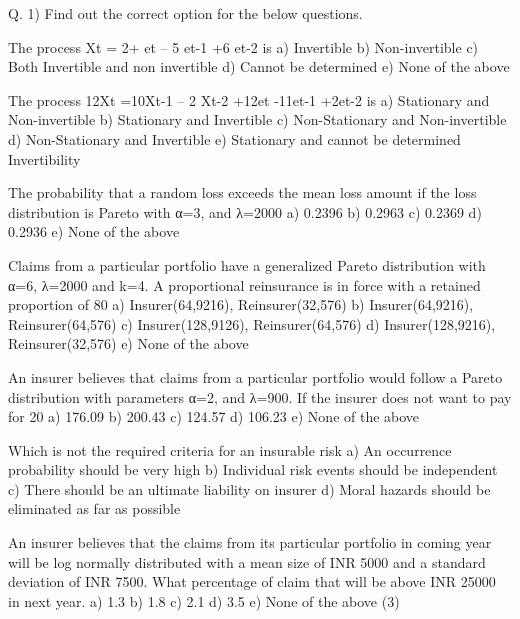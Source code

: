 \documentclass[a4paper,12pt]{article}
\begin{document}
Q. 1) Find out the correct option for the below questions.
\item  The process Xt = 2+ et – 5 et-1 +6 et-2 is
a) Invertible
b) Non-invertible
c) Both Invertible and non invertible
d) Cannot be determined
e) None of the above 

\item   The process 12Xt =10Xt-1 – 2 Xt-2 +12et -11et-1 +2et-2 is
a) Stationary and Non-invertible
b) Stationary and Invertible
c) Non-Stationary and Non-invertible
d) Non-Stationary and Invertible
e) Stationary and cannot be determined Invertibility 

\item    The probability that a random loss exceeds the mean loss amount if the loss
distribution is Pareto with α=3, and λ=2000
a) 0.2396
b) 0.2963
c) 0.2369
d) 0.2936
e) None of the above 


\item  Claims from a particular portfolio have a generalized Pareto distribution with α=6,
λ=2000 and k=4. A proportional reinsurance is in force with a retained proportion of
80%
a) Insurer(64,9216), Reinsurer(32,576)
b) Insurer(64,9216), Reinsurer(64,576)
c) Insurer(128,9126), Reinsurer(64,576)
d) Insurer(128,9216), Reinsurer(32,576)
e) None of the above


\item  An insurer believes that claims from a particular portfolio would follow a Pareto
distribution with parameters α=2, and λ=900. If the insurer does not want to pay for
20%
a) 176.09
b) 200.43
c) 124.57
d) 106.23
e) None of the above

\item   Which is not the required criteria for an insurable risk
a) An occurrence probability should be very high
b) Individual risk events should be independent
c) There should be an ultimate liability on insurer
d) Moral hazards should be eliminated as far as possible 

\item    An insurer believes that the claims from its particular portfolio in coming year will
be log normally distributed with a mean size of INR 5000 and a standard deviation
of INR 7500. What percentage of claim that will be above INR 25000 in next year.
a) 1.3%
b) 1.8%
c) 2.1%
d) 3.5%
e) None of the above (3)
\end{document}
